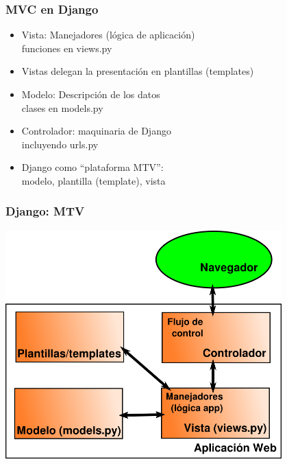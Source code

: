 \begin{frame}
\frametitle{MVC en Django}

\begin{itemize}
\item Vista: Manejadores (lógica de aplicación) \\
  funciones en views.py
\item Vistas delegan la presentación en plantillas (templates)
\item Modelo: Descripción de los datos \\
  clases en models.py
\item Controlador: maquinaria de Django \\
  incluyendo urls.py
\item Django como ``plataforma MTV'': \\
  modelo, plantilla (template), vista
\end{itemize}

\end{frame}


\begin{frame}
\frametitle{Django: MTV}

\begin{center}
\includegraphics[width=0.8\textwidth]{figs/mvc-mtv}
\end{center}
\end{frame}


